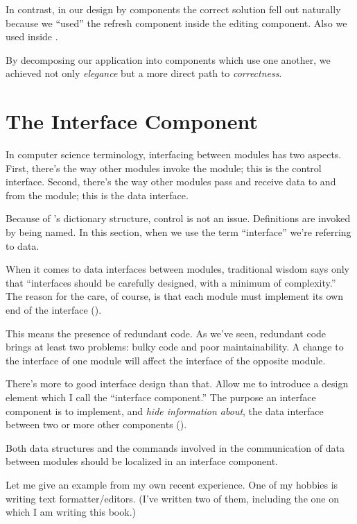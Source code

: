 
In contrast, in our design by components the correct solution fell
out naturally because we ``used'' the refresh component inside the editing
component. Also we used  inside .

By decomposing our application into components which use one another,
we achieved not only \emph{elegance} but a more direct path to
\emph{correctness}.

\section{The Interface Component}%

In computer science terminology, interfacing between modules has two
aspects. First, there's the way other modules invoke the module; this is
the control interface. Second, there's the way other modules pass and
receive data to and from the module; this is the data interface.

Because of \Forth{}'s dictionary structure, control is not an issue.
Definitions are invoked by being named. In this section, when we use the
term ``interface'' we're referring to data.

When it comes to data interfaces between modules, traditional wisdom
says only that ``interfaces should be carefully designed, with a
minimum of complexity.'' The reason for the care, of course, is that
each module must implement its own end of the interface ().

This means the presence of redundant code. As we've seen, redundant
code brings at least two problems: bulky code and poor maintainability.
A change to the interface of one module will affect the interface
of the opposite module.


There's more to good interface design than that. Allow me to introduce
a design element which I call the ``interface component.'' The purpose
an interface component is to implement, and
\emph{hide information about},%
the data interface between two or more other components
().


\begin{tip}
Both data structures and the commands involved in the communication of
data between modules should be localized in an interface component.
\end{tip}
Let me give an example from my own recent experience. One of my hobbies
is writing text formatter/editors. (I've written two of them, including
the one on which I am writing this book.)

